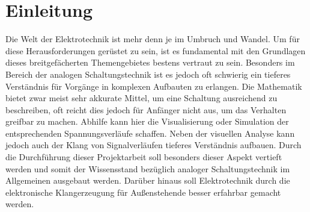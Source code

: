 \chapter{Einleitung}
\label{ch:intro}

Die Welt der Elektrotechnik ist mehr denn je im Umbruch und Wandel. Um für diese Herausforderungen gerüstet zu sein, 
ist es fundamental mit den Grundlagen dieses breitgefächerten Themengebietes bestens vertraut zu sein.
Besonders im Bereich der analogen Schaltungstechnik ist es jedoch oft schwierig ein 
tieferes Verständnis für Vorgänge in komplexen Aufbauten zu erlangen. Die Mathematik bietet zwar meist sehr akkurate Mittel, um eine Schaltung ausreichend zu beschreiben, oft reicht dies jedoch für Anfänger nicht aus, um das Verhalten greifbar zu machen.
Abhilfe kann hier die Visualisierung oder Simulation der entsprechenden Spannungsverläufe schaffen. 
Neben der visuellen Analyse kann jedoch auch der Klang von Signalverläufen tieferes Verständnis aufbauen.
Durch die Durchführung dieser Projektarbeit soll besonders dieser Aspekt vertieft werden 
und somit der Wissensstand bezüglich analoger Schaltungstechnik im Allgemeinen ausgebaut werden. 
Darüber hinaus soll Elektrotechnik durch die elektronische Klangerzeugung für Außenstehende besser erfahrbar gemacht werden.
